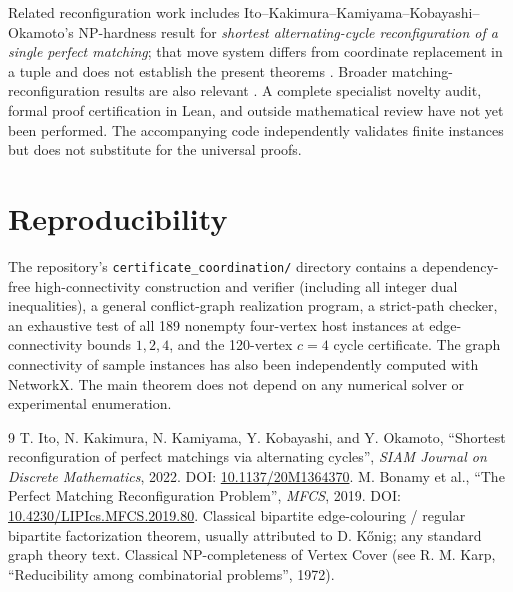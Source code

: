 \documentclass[10pt]{article}
\begin{document}
Related reconfiguration work includes Ito--Kakimura--Kamiyama--Kobayashi--Okamoto's NP-hardness result for \emph{shortest alternating-cycle reconfiguration of a single perfect matching}; that move system differs from coordinate replacement in a tuple and does not establish the present theorems \cite{ito}. Broader matching-reconfiguration results are also relevant \cite{bonamy}. A complete specialist novelty audit, formal proof certification in Lean, and outside mathematical review have not yet been performed. The accompanying code independently validates finite instances but does not substitute for the universal proofs.

\section*{Reproducibility}
The repository's \texttt{certificate\_coordination/} directory contains a dependency-free high-connectivity construction and verifier (including all integer dual inequalities), a general conflict-graph realization program, a strict-path checker, an exhaustive test of all 189 nonempty four-vertex host instances at edge-connectivity bounds $1,2,4$, and the 120-vertex $c=4$ cycle certificate. The graph connectivity of sample instances has also been independently computed with NetworkX. The main theorem does not depend on any numerical solver or experimental enumeration.

\begin{thebibliography}{9}
 T. Ito, N. Kakimura, N. Kamiyama, Y. Kobayashi, and Y. Okamoto, ``Shortest reconfiguration of perfect matchings via alternating cycles'', \emph{SIAM Journal on Discrete Mathematics}, 2022. DOI: \href{https://doi.org/10.1137/20M1364370}{10.1137/20M1364370}.
 M. Bonamy et al., ``The Perfect Matching Reconfiguration Problem'', \emph{MFCS}, 2019. DOI: \href{https://doi.org/10.4230/LIPIcs.MFCS.2019.80}{10.4230/LIPIcs.MFCS.2019.80}.
 Classical bipartite edge-colouring / regular bipartite factorization theorem, usually attributed to D. K\H{o}nig; any standard graph theory text.
 Classical NP-completeness of Vertex Cover (see R. M. Karp, ``Reducibility among combinatorial problems'', 1972).
\end{thebibliography}
\end{document}
